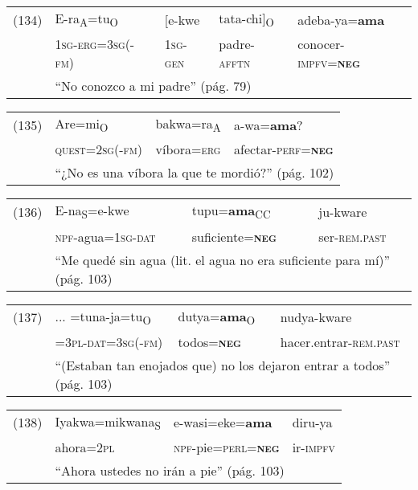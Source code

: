 {\setmainfont{Charis SIL} 

\begin{tabular}{lllll}
(134) & E-ra\textsubscript{A}=tu\textsubscript{O} & [e-kwe & tata-chi]\textsubscript{O} & adeba-ya=\textbf{ama} \\
& \textsc{1sg-erg=3sg(-fm)} & \textsc{1sg-gen} & padre-\textsc{afftn} & conocer-\textsc{impfv=\textbf{neg}} \\
& \multicolumn{4}{l}{``No conozco a mi padre'' (pág. 79)}
\end{tabular} \vspace{0.5cm}

\begin{tabular}{llll}
(135) & Are=mi\textsubscript{O} & bakwa=ra\textsubscript{A} & a-wa=\textbf{ama}? \\
& \textsc{quest=2sg(-fm)} & víbora=\textsc{erg} & afectar-\textsc{perf=\textbf{neg}} \\
& \multicolumn{3}{l}{``¿No es una víbora la que te mordió?'' (pág. 102)}
\end{tabular} \vspace{0.5cm}

\begin{tabular}{llll}
(136) & E-na\textsubscript{S}=e-kwe & tupu=\textbf{ama}\textsubscript{CC} & ju-kware \\
& \textsc{npf-}agua=\textsc{1sg-dat} & suficiente=\textsc{\textbf{neg}} & ser-\textsc{rem.past} \\
& \multicolumn{3}{l}{``Me quedé sin agua (lit. el agua no era suficiente para mí)'' (pág. 103)}
\end{tabular} \vspace{0.5cm}

\begin{tabular}{llll}
(137) & ... =tuna-ja=tu\textsubscript{O} & dutya=\textbf{ama}\textsubscript{O} & nudya-kware \\
& =\textsc{3pl-dat=3sg(-fm)} & todos=\textsc{\textbf{neg}} & hacer.entrar-\textsc{rem.past} \\
& \multicolumn{3}{l}{``(Estaban tan enojados que) no los dejaron entrar a todos'' (pág. 103)}
\end{tabular} \vspace{0.5cm}

\begin{tabular}{llll}
(138) & Iyakwa=mikwana\textsubscript{S} & e-wasi=eke=\textbf{ama} & diru-ya \\
& ahora=\textsc{2pl} & \textsc{npf-}pie=\textsc{perl=\textbf{neg}} & ir-\textsc{impfv} \\
& \multicolumn{3}{l}{``Ahora ustedes no irán a pie'' (pág. 103)}
\end{tabular} \vspace{0.5cm}

}
